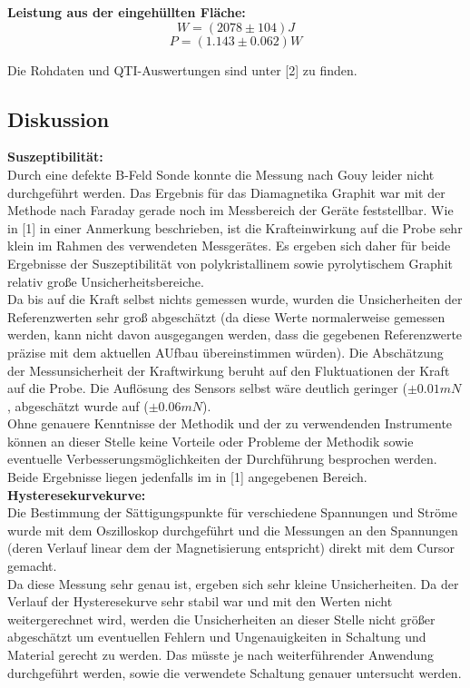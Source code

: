 \documentclass[12pt,a4paper]{article}
\begin{document}
\begin{multicols}{2}



\noindent \textbf{Leistung aus der eingehüllten Fläche:}\\ 
$$W =%
(2078 \pm 104)J$$
$$P=(1.143 \pm 0.062)W$$

\noindent
Die Rohdaten und QTI-Auswertungen sind unter [2] zu finden.

\subsection{Diskussion}
\textbf{Suszeptibilität:}\\
Durch eine defekte B-Feld Sonde konnte die Messung nach Gouy leider nicht durchgeführt werden. Das Ergebnis für das Diamagnetika Graphit war mit der Methode nach Faraday gerade noch im Messbereich der Geräte feststellbar. Wie in [1] in einer Anmerkung beschrieben, ist die Krafteinwirkung auf die Probe sehr klein im Rahmen des verwendeten Messgerätes. Es ergeben sich daher für beide Ergebnisse der Suszeptibilität  von polykristallinem sowie pyrolytischem Graphit relativ große Unsicherheitsbereiche.\\
Da bis auf die Kraft selbst nichts gemessen wurde, wurden die Unsicherheiten der Referenzwerten sehr groß abgeschätzt (da diese Werte normalerweise gemessen werden, kann nicht davon ausgegangen werden, dass die gegebenen Referenzwerte präzise mit dem aktuellen AUfbau übereinstimmen würden). Die Abschätzung der Messunsicherheit der Kraftwirkung beruht auf den Fluktuationen der Kraft auf die Probe. Die Auflösung des Sensors selbst wäre deutlich geringer ($\pm 0.01mN$, abgeschätzt wurde auf ($\pm 0.06mN$).\\
Ohne genauere Kenntnisse der Methodik und der zu verwendenden Instrumente können an dieser Stelle keine Vorteile oder Probleme der Methodik sowie eventuelle Verbesserungsmöglichkeiten der Durchführung besprochen werden.\\
Beide Ergebnisse liegen jedenfalls im in [1] angegebenen Bereich.\\


\noindent \textbf{Hysteresekurvekurve:}\\
Die Bestimmung der Sättigungspunkte für verschiedene Spannungen und Ströme wurde mit dem Oszilloskop durchgeführt und die Messungen an den Spannungen (deren Verlauf linear dem der Magnetisierung entspricht) direkt mit dem Cursor gemacht.\\
Da diese Messung sehr genau ist, ergeben sich sehr kleine Unsicherheiten. Da der Verlauf der Hysteresekurve sehr stabil war und mit den Werten nicht weitergerechnet wird, werden die Unsicherheiten an dieser Stelle nicht größer abgeschätzt um eventuellen Fehlern und Ungenauigkeiten in Schaltung und Material gerecht zu werden. Das müsste je nach weiterführender Anwendung durchgeführt werden, sowie die verwendete Schaltung genauer untersucht werden.\\


\end{multicols}
\end{document}
